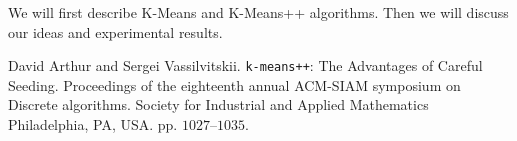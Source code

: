 \documentclass[10pt, leqno]{article}
\begin{document}
	We will first describe K-Means and K-Means++ algorithms. Then we will discuss our ideas and experimental results.
	\begin{thebibliography}{99}
		 David Arthur and Sergei Vassilvitskii. \texttt{k-means++}: The Advantages of Careful Seeding. Proceedings of the eighteenth annual ACM-SIAM symposium on Discrete algorithms. Society for Industrial and Applied Mathematics Philadelphia, PA, USA. pp. $1027–1035$.
	\end{thebibliography}
\end{document}
